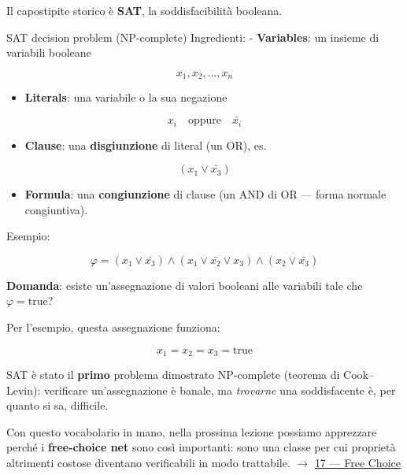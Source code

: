 Il capostipite storico è \textbf{SAT}, la soddisfacibilità booleana.

\begin{boxdefinition}{SAT decision problem (NP-complete)}
Ingredienti: - \textbf{Variables}: un insieme di variabili booleane

\[
x_1, x_2, \dots, x_n
\]

\begin{itemize}
\item \textbf{Literals}: una variabile o la sua negazione
\end{itemize}

\[
x_i \quad \text{oppure} \quad \bar{x_i}
\]

\begin{itemize}
\item \textbf{Clause}: una \textbf{disgiunzione} di literal (un OR), es.
\end{itemize}

\[
(x_1 \vee \bar{x_3})
\]

\begin{itemize}
\item \textbf{Formula}: una \textbf{congiunzione} di clause (un AND di OR — forma normale congiuntiva).
\end{itemize}

Esempio:

\[
\varphi = (x_1 \vee \bar{x_3}) \wedge (x_1 \vee \bar{x_2} \vee x_3) \wedge (x_2 \vee \bar{x_3})
\]

\textbf{Domanda}: esiste un'assegnazione di valori booleani alle variabili tale che $\varphi = \text{true}$?

Per l'esempio, questa assegnazione funziona:

\[
x_1 = x_2 = x_3 = \text{true}
\]
\end{boxdefinition}

SAT è stato il \textbf{primo} problema dimostrato NP-complete (teorema di Cook–Levin): verificare un'assegnazione è banale, ma \emph{trovarne} una soddisfacente è, per quanto si sa, difficile.

Con questo vocabolario in mano, nella prossima lezione possiamo apprezzare perché i \textbf{free-choice net} sono così importanti: sono una classe per cui proprietà altrimenti costose diventano verificabili in modo trattabile. $\rightarrow$ \hyperref[ch:17]{17 — Free Choice}